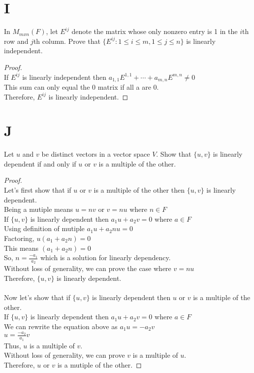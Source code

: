 \documentclass[11pt]{scrartcl}
\begin{document}
\section{I} 
In $M_{mxn}(F)$, let $E^{ij}$ denote the matrix whose only nonzero entry is 1 in the $i$th row and $j$th column. Prove that $\{E^{ij}: 1 \leq i \leq m,
1 \leq j \leq n\}$ is linearly independent.
\begin{proof}
	\-\\
	If $E^{ij}$ is linearly independent then $a_{1,1}E^{1,1} + \cdots + a_{m,n}E^{m,n} \neq 0$\\
	This sum can only equal the 0 matrix if all a are 0.\\
	Therefore, $E^{ij}$ is linearly independent.
\end{proof}
\section{J}
Let $u$ and $v$ be distinct vectors in a vector space $V$. Show that $\{u,v\}$ is linearly dependent if and only if $u$ or $v$ is a
multiple of the other.

\begin{proof}
\-\\
	Let's first show that if $u$ or $v$ is a multiple of the other then $\{u,v\}$ is linearly dependent.\\
	Being a mutiple means $u = nv$ or $v = nu$ where $n \in F$ \\
	If $\{u,v\}$ is linearly dependent then $a_1u + a_2v = 0$ where $a \in F$\\
	Using definition of mutiple $a_1u + a_2nu = 0$\\
	Factoring, $u(a_1 + a_2n) = 0$\\
	This means $(a_1 + a_2n) = 0$\\	
	So, $n = \frac{-a_1}{a_2}$ which is a solution for linearly dependency.\\
	Without loss of generality, we can prove the case where $ v = nu$\\
	Therefore, $\{u,v\}$ is linearly dependent.\\
	\-\\
	Now let's show that if $\{u,v\}$ is linearly dependent then $u$ or $v$ is a multiple of the other.\\
	If $\{u,v\}$ is linearly dependent then $a_1u + a_2v = 0$ where $a \in F$\\
	We can rewrite the equation above as $a_1u = -a_2v$\\
	$u = \frac{-a_2}{a_1}v$\\
	Thus, $u$ is a multiple of $v$.\\
	Without loss of generality, we can prove $v$ is a multiple of $u$.\\
	Therefore, $u$ or $v$ is a mutiple of the other.
\end{proof}
\end{document}
